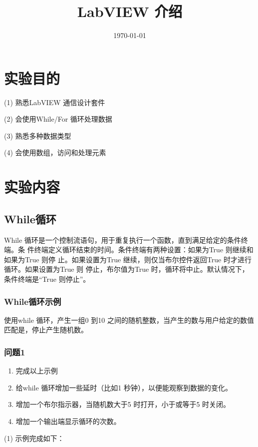 \documentclass{../source/Experiment}
\title{LabVIEW 介绍}
\date{\today}
\begin{document}
    \makecover
    \makeheader
    \section{实验目的}
    (1) 熟悉LabVIEW 通信设计套件

    (2) 会使用While/For 循环处理数据

    (3) 熟悉多种数据类型

    (4) 会使用数组，访问和处理元素

    \section{实验内容}
        \subsection{While循环}
        While 循环是一个控制流语句，用于重复执行一个函数，直到满足给定的条件终端。条
        件终端定义循环结束的时间。条件终端有两种设置：如果为True 则继续和如果为True 则停
        止。如果设置为True 继续，则仅当布尔控件返回True 时才进行循环。如果设置为True 则
        停止，布尔值为True 时，循环将中止。默认情况下，条件终端是“True 则停止”。
        \subsubsection{While循环示例}
        使用while 循环，产生一组0 到10 之间的随机整数，当产生的数与用户给定的数值匹配是，停止产生随机数。
        \subsubsection{问题1}
        \begin{enumerate}
            \item 完成以上示例
            \item 给while 循环增加一些延时（比如1 秒钟），以便能观察到数据的变化。
            \item 增加一个布尔指示器，当随机数大于5 时打开，小于或等于5 时关闭。
            \item 增加一个输出端显示循环的次数。
        \end{enumerate}

        (1) 示例完成如下：
\end{document}

